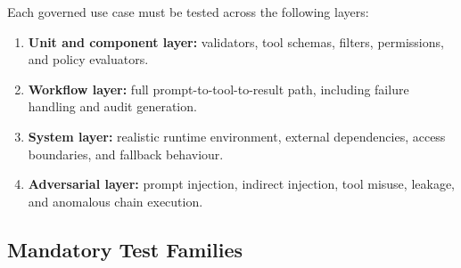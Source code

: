 \documentclass[11pt,a4paper]{article}
\begin{document}
Each governed use case must be tested across the following layers:

\begin{enumerate}[nosep]
    \item \textbf{Unit and component layer:} validators, tool schemas, filters, permissions, and policy evaluators.
    \item \textbf{Workflow layer:} full prompt-to-tool-to-result path, including failure handling and audit generation.
    \item \textbf{System layer:} realistic runtime environment, external dependencies, access boundaries, and fallback behaviour.
    \item \textbf{Adversarial layer:} prompt injection, indirect injection, tool misuse, leakage, and anomalous chain execution.
\end{enumerate}

\subsection{Mandatory Test Families}
\end{document}
